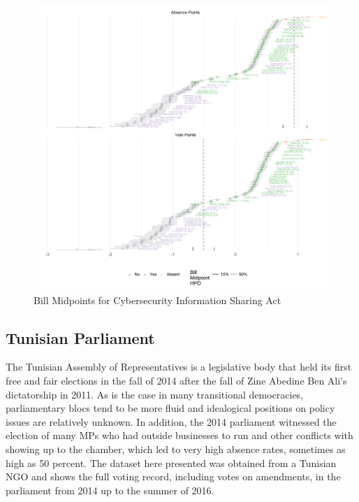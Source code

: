 \begin{figure}
	\caption{Bill Midpoints for Cybersecurity Information Sharing Act}\label{cyber}
	\centering
	\includegraphics[width=\linewidth]{con_discrim_bill}
\end{figure}


	
	\subsection*{Tunisian Parliament}
	
	The Tunisian Assembly of Representatives is a legislative body that held its first free and fair elections in the fall of 2014 after the fall of Zine Abedine Ben Ali's dictatorship in 2011. As is the case in many transitional democracies, parliamentary blocs tend to be more fluid and idealogical positions on policy issues are relatively unknown. In addition, the 2014 parliament witnessed the election of many MPs who had outside businesses to run and other conflicts with showing up to the chamber, which led to very high absence rates, sometimes as high as 50 percent. The dataset here presented was obtained from a Tunisian NGO and shows the full voting record, including votes on amendments, in the parliament from 2014 up to the summer of 2016. 
	
